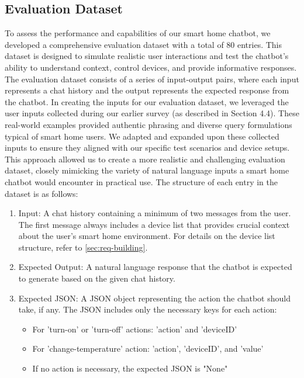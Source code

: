 \subsection{Evaluation Dataset}
To assess the performance and capabilities of our smart home chatbot, we developed a comprehensive evaluation dataset with a total of 80 entries. This dataset is designed to simulate realistic user interactions and test the chatbot's ability to understand context, control devices, and provide informative responses.
The evaluation dataset consists of a series of input-output pairs, where each input represents a chat history and the output represents the expected response from the chatbot. 
In creating the inputs for our evaluation dataset, we leveraged the user inputs collected during our earlier survey (as described in Section 4.4). These real-world examples provided authentic phrasing and diverse query formulations typical of smart home users. We adapted and expanded upon these collected inputs to ensure they aligned with our specific test scenarios and device setups. This approach allowed us to create a more realistic and challenging evaluation dataset, closely mimicking the variety of natural language inputs a smart home chatbot would encounter in practical use.
The structure of each entry in the dataset is as follows:

\begin{enumerate}
    \item Input: A chat history containing a minimum of two messages from the user. The first message always includes a device list that provides crucial context about the user's smart home environment. For details on the device list structure, refer to \cref{sec:req-building}.
    \item Expected Output: A natural language response that the chatbot is expected to generate based on the given chat history.
    \item Expected JSON: A JSON object representing the action the chatbot should take, if any. The JSON includes only the necessary keys for each action:
    \begin{itemize}
    \item For 'turn-on' or 'turn-off' actions: 'action' and 'deviceID'
    \item For 'change-temperature' action: 'action', 'deviceID', and 'value'
    \item If no action is necessary, the expected JSON is "None"
    \end{itemize}
    \end{enumerate}

